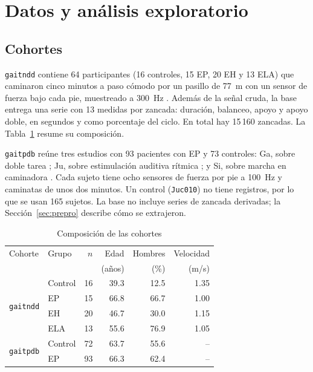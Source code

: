 \documentclass[conference]{IEEEtran}
\newcommand{\gaitndd}{\texttt{gaitndd}}
\newcommand{\gaitpdb}{\texttt{gaitpdb}}
\begin{document}
\section{Datos y análisis exploratorio}

\subsection{Cohortes}
\gaitndd{} contiene 64 participantes (16 controles, 15 EP, 20 EH y 13 ELA) que caminaron cinco minutos a paso cómodo por un pasillo de 77~m con un sensor de fuerza bajo cada pie, muestreado a 300~Hz \cite{hausdorff2000,goldberger2000}. Además de la señal cruda, la base entrega una serie con 13 medidas por zancada: duración, balanceo, apoyo y apoyo doble, en segundos y como porcentaje del ciclo. En total hay 15\,160 zancadas. La Tabla~\ref{tab:cohorte} resume su composición.

\gaitpdb{} reúne tres estudios con 93 pacientes con EP y 73 controles: Ga, sobre doble tarea \cite{yogev2005}; Ju, sobre estimulación auditiva rítmica \cite{hausdorff2007}; y Si, sobre marcha en caminadora \cite{frenkel2005}. Cada sujeto tiene ocho sensores de fuerza por pie a 100~Hz y caminatas de unos dos minutos. Un control (\texttt{Juc010}) no tiene registros, por lo que se usan 165 sujetos. La base no incluye series de zancada derivadas; la Sección~\ref{sec:prepro} describe cómo se extrajeron.

\begin{table}[t]
\caption{Composición de las cohortes}
\label{tab:cohorte}
\centering
\footnotesize
\begin{tabular}{@{}llrrrr@{}}
\toprule
Cohorte & Grupo & $n$ & Edad & Hombres & Velocidad \\
 & & & (años) & (\%) & (m/s) \\
\midrule
\multirow{4}{*}{\gaitndd} & Control & 16 & 39.3 & 12.5 & 1.35 \\
 & EP & 15 & 66.8 & 66.7 & 1.00 \\
 & EH & 20 & 46.7 & 30.0 & 1.15 \\
 & ELA & 13 & 55.6 & 76.9 & 1.05 \\
\midrule
\multirow{2}{*}{\gaitpdb} & Control & 72 & 63.7 & 55.6 & -- \\
 & EP & 93 & 66.3 & 62.4 & -- \\
\bottomrule
\end{tabular}
\end{table}
\end{document}
